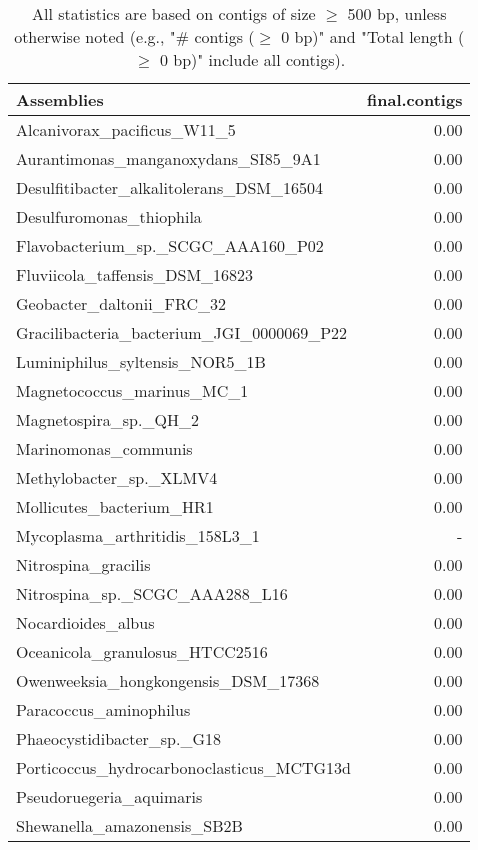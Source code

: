 \documentclass[12pt,a4paper]{article}
\begin{document}
\begin{table}[ht]
\begin{center}
\caption{All statistics are based on contigs of size $\geq$ 500 bp, unless otherwise noted (e.g., "\# contigs ($\geq$ 0 bp)" and "Total length ($\geq$ 0 bp)" include all contigs).}
\begin{tabular}{|l*{1}{|r}|}
\hline
Assemblies & final.contigs \\ \hline
Alcanivorax\_pacificus\_W11\_5 & 0.00 \\ \hline
Aurantimonas\_manganoxydans\_SI85\_9A1 & 0.00 \\ \hline
Desulfitibacter\_alkalitolerans\_DSM\_16504 & 0.00 \\ \hline
Desulfuromonas\_thiophila & 0.00 \\ \hline
Flavobacterium\_sp.\_SCGC\_AAA160\_P02 & 0.00 \\ \hline
Fluviicola\_taffensis\_DSM\_16823 & 0.00 \\ \hline
Geobacter\_daltonii\_FRC\_32 & 0.00 \\ \hline
Gracilibacteria\_bacterium\_JGI\_0000069\_P22 & 0.00 \\ \hline
Luminiphilus\_syltensis\_NOR5\_1B & 0.00 \\ \hline
Magnetococcus\_marinus\_MC\_1 & 0.00 \\ \hline
Magnetospira\_sp.\_QH\_2 & 0.00 \\ \hline
Marinomonas\_communis & 0.00 \\ \hline
Methylobacter\_sp.\_XLMV4 & 0.00 \\ \hline
Mollicutes\_bacterium\_HR1 & 0.00 \\ \hline
Mycoplasma\_arthritidis\_158L3\_1 & - \\ \hline
Nitrospina\_gracilis & 0.00 \\ \hline
Nitrospina\_sp.\_SCGC\_AAA288\_L16 & 0.00 \\ \hline
Nocardioides\_albus & 0.00 \\ \hline
Oceanicola\_granulosus\_HTCC2516 & 0.00 \\ \hline
Owenweeksia\_hongkongensis\_DSM\_17368 & 0.00 \\ \hline
Paracoccus\_aminophilus & 0.00 \\ \hline
Phaeocystidibacter\_sp.\_G18 & 0.00 \\ \hline
Porticoccus\_hydrocarbonoclasticus\_MCTG13d & 0.00 \\ \hline
Pseudoruegeria\_aquimaris & 0.00 \\ \hline
Shewanella\_amazonensis\_SB2B & 0.00 \\ \hline

\end{tabular}
\end{center}
\end{table}
\end{document}
